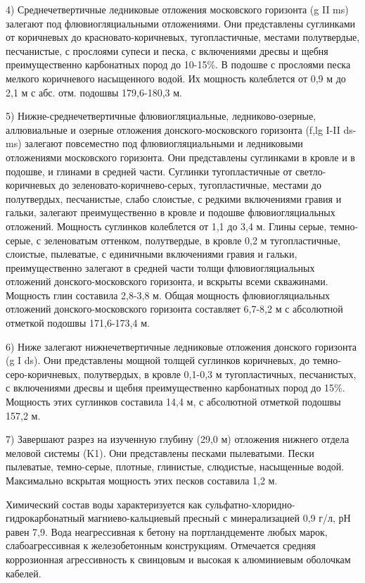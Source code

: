 4) Среднечетвертичные ледниковые отложения московского горизонта (g II ms) залегают под флювиогляциальными отложениями. Они представлены суглинками от коричневых до красновато-коричневых, тугопластичные, местами полутвердые, песчанистые, с прослоями супеси и песка, с включениями дресвы и щебня преимущественно карбонатных пород до 10-15\%. В подошве с прослоями песка мелкого коричневого насыщенного водой. Их мощность колеблется от 0,9 м до 2,1 м с абс. отм. подошвы 179,6-180,3 м.

5) Нижне-среднечетвертичные флювиогляциальные, ледниково-озерные, аллювиальные и озерные отложения донского-московского горизонта (f,lg I-II ds-ms) залегают повсеместно под флювиогляциальными и ледниковыми отложениями московского горизонта. Они представлены суглинками в кровле и в подошве, и глинами в средней части. Суглинки тугопластичные от светло-коричневых до зеленовато-коричнево-серых, тугопластичные, местами до полутвердых, песчанистые, слабо слоистые, с редкими включениями гравия и гальки, залегают преимущественно в кровле и подошве флювиогляциальных отложений. Мощность суглинков колеблется от 1,1 до 3,4 м. Глины серые, темно-серые, с зеленоватым оттенком, полутвердые, в кровле 0,2 м тугопластичные, слоистые, пылеватые, с единичными включениями гравия и гальки, преимущественно залегают в средней части толщи флювиогляциальных отложений донского-московского горизонта, и вскрыты всеми скважинами. Мощность глин составила 2,8-3,8 м. Общая мощность флювиогляциальных отложений донского-московского горизонта составляет 6,7-8,2 м с абсолютной отметкой подошвы 171,6-173,4 м.

6) Ниже залегают нижнечетвертичные ледниковые отложения донского горизонта (g I ds). Они представлены мощной толщей суглинков коричневых, до темно-серо-коричневых, полутвердых, в кровле 0,1-0,3 м тугопластичных, песчанистых, с включениями дресвы и щебня преимущественно карбонатных пород до 15\%. Мощность этих суглинков составила 14,4 м, с абсолютной отметкой подошвы 157,2 м.

7) Завершают разрез на изученную глубину (29,0 м) отложения нижнего отдела меловой системы (K1). Они представлены песками пылеватыми. Пески пылеватые, темно-серые, плотные, глинистые, слюдистые, насыщенные водой. Максимально вскрытая мощность этих песков составила 1,2 м.

Химический состав воды характеризуется как сульфатно-хлоридно-гидрокарбонатный магниево-кальциевый пресный с минерализацией 0,9 г/л, рН равен 7,9. Вода неагрессивная к бетону на портландцементе любых марок, слабоагрессивная к железобетонным конструкциям. Отмечается средняя коррозионная агрессивность к свинцовым и высокая к алюминиевым оболочкам кабелей.


